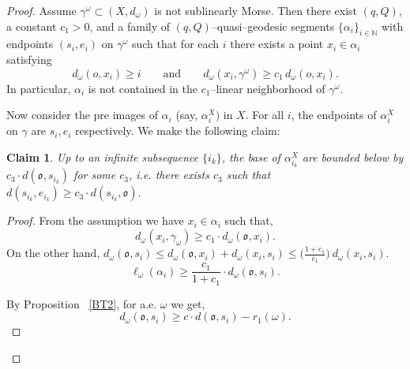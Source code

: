 \documentclass[12 pt]{amsart}
\newcommand{\NN}{\mathbb{N}}
\newcommand{\gothic}{\mathfrak}
\newcommand{\go}{{\gothic o}}
\newtheorem{claim}[theorem]{Claim}
\theoremstyle{definition}
\theoremstyle{remark}
\begin{document}
\begin{proof}
Assume $\gamma^{\omega}\subset (X,d_{\omega})$ is not sublinearly Morse. Then there exist $(q,Q)$, a constant $c_{1}>0$, and a family of $(q,Q)$--quasi--geodesic segments 
$\{\alpha_i\}_{i\in\mathbb N}$ with endpoints $(s_i,e_i)$ on $\gamma^{\omega}$ such that for each $i$ there exists a point 
$x_i\in \alpha_i$ satisfying
\[
d_{\omega}(o,x_i)\ge i
\qquad\text{and}\qquad
d_{\omega}(x_i,\gamma^{\omega})\ge c_{1}\, d_{\omega}(o,x_i).
\]
In particular, $\alpha_i$ is not contained in the $c_{1}$--linear neighborhood of $\gamma^{\omega}$.


Now consider the pre images of $\alpha_i$ (say, $\alpha_i^X)$ in $X$. For all $i$, the endpoints of $\alpha_i^X$ on $\gamma$ are $s_i,e_i$ respectively. We make the following claim:
\begin{claim}
Up to an infinite subsequence $\{i_k\}$, the base of $\alpha^X_{i_k}$ are bounded below by $c_3 \cdot d(\go, s_{i_k})$ for some $c_3$, i.e. there exists $c_3$ such that $d(s_{i_k},e_{i_k}) \geq c_3 \cdot d(s_{i_k}, \go). $ 
\end{claim}
\begin{proof} From the assumption we have $x_i \in  \alpha_i$ such that, \[d_\omega(x_i,\gamma_\omega) \ge c_1 \cdot d_\omega(\go,x_i).\]
On the other hand,  $d_\omega(\go,s_i) \le d_\omega(\go,x_i) + d_\omega(x_i,s_i) \le \big(\frac{1+c_1}{c_1}\big)\ d_\omega(x_i,s_i).$
\begin{equation} \label{eq:upperbound}
   \ell_\omega(\alpha_i) \ge \frac{c_1}{1+c_1} \cdot d_\omega(\go,s_i).
\end{equation}

By Proposition ~\ref{BT2}, for a.e. $\omega$ we get,
\begin{equation} \label{eq:lowerbound}
    d_\omega(\go,s_i)\ge c \cdot d(\go,s_i)-r_1(\omega).
\end{equation}
    

\end{proof}
\end{proof}
\end{document}
